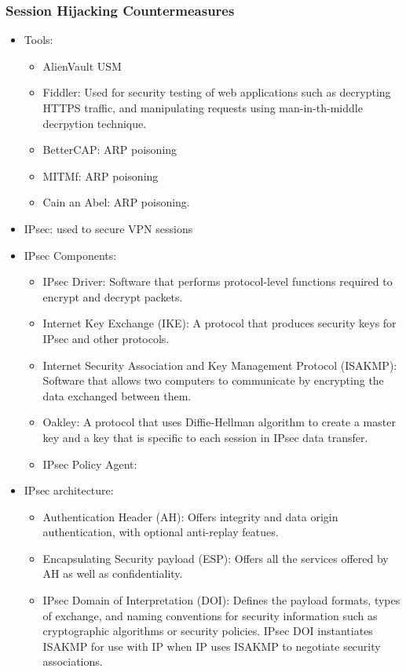 \subsubsection{Session Hijacking Countermeasures}
\begin{itemize}
    \item Tools:
    \begin{itemize}
        \item AlienVault USM
        \item Fiddler: Used for security testing of web applications such as  decrypting HTTPS traffic, and manipulating requests using man-in-th-middle decrpytion technique.
        \item BetterCAP: ARP poisoning
        \item MITMf: ARP poisoning
        \item Cain an Abel: ARP poisoning.
    \end{itemize}
    \item IPsec: used to secure VPN sessions
    \item IPsec Components:
    \begin{itemize}
        \item IPsec Driver: Software that performs protocol-level functions required to encrypt and decrypt packets.
        \item Internet Key Exchange (IKE): A protocol that produces security keys for IPsec and other protocols.
        \item Internet Security Association and Key Management Protocol (ISAKMP): Software that allows two computers to communicate by encrypting the data exchanged between them.
        \item Oakley: A protocol that uses Diffie-Hellman algorithm to create a master key and a key that is specific to each session in IPsec data transfer.
        \item IPsec Policy Agent:
    \end{itemize}
    \item IPsec architecture:
    \begin{itemize}
        \item Authentication Header (AH): Offers integrity and data origin authentication, with optional anti-replay featues.
        \item Encapsulating Security payload (ESP): Offers all the services offered by AH as well as confidentiality.
        \item IPsec Domain of Interpretation (DOI): Defines the payload formats, types of exchange, and naming conventions for security information such as cryptographic algorithms or security policies. IPsec DOI instantiates ISAKMP for use with IP when IP uses ISAKMP to negotiate security associations.

\end{itemize}
\end{itemize}
